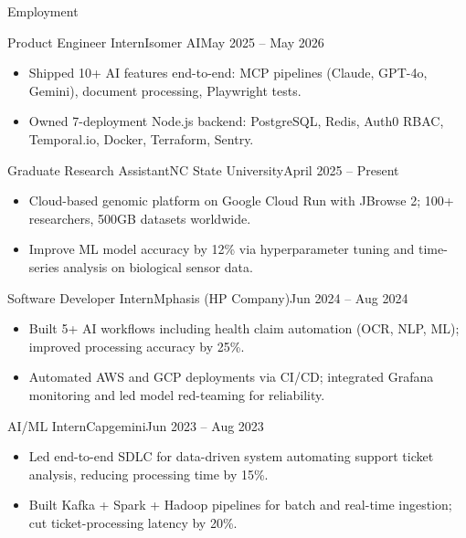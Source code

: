 \documentclass[]{mcdowellcv}
\begin{document}
\makeheader

\begin{cvsection}{Employment}
  \begin{cvsubsection}{Product Engineer Intern}{Isomer AI}{May 2025 -- May 2026}
    \begin{itemize}
      \item Shipped 10+ AI features end-to-end: MCP pipelines (Claude, GPT-4o, Gemini), document processing, Playwright tests.
      \item Owned 7-deployment Node.js backend: PostgreSQL, Redis, Auth0 RBAC, Temporal.io, Docker, Terraform, Sentry.
    \end{itemize}
    \vspace{-1.5pt}
  \end{cvsubsection}

  \begin{cvsubsection}{Graduate Research Assistant}{NC State University}{April 2025 -- Present}
    \begin{itemize}
      \item Cloud-based genomic platform on Google Cloud Run with JBrowse 2; 100+ researchers, 500GB datasets worldwide.
      \item Improve ML model accuracy by 12\% via hyperparameter tuning and time-series analysis on biological sensor data.
    \end{itemize}
    \vspace{-1.5pt}
  \end{cvsubsection}

  \begin{cvsubsection}{Software Developer Intern}{Mphasis (HP Company)}{Jun 2024 -- Aug 2024}
    \begin{itemize}
      \item Built 5+ AI workflows including health claim automation (OCR, NLP, ML); improved processing accuracy by 25\%.
      \item Automated AWS and GCP deployments via CI/CD; integrated Grafana monitoring and led model red-teaming for reliability.
    \end{itemize}
    \vspace{-1.5pt}
  \end{cvsubsection}

  \begin{cvsubsection}{AI/ML Intern}{Capgemini}{Jun 2023 -- Aug 2023}
    \begin{itemize}
      \item Led end-to-end SDLC for data-driven system automating support ticket analysis, reducing processing time by 15\%.
      \item Built Kafka + Spark + Hadoop pipelines for batch and real-time ingestion; cut ticket-processing latency by 20\%.
    \end{itemize}
    \vspace{-1.5pt}
  \end{cvsubsection}
\end{cvsection}
\end{document}
